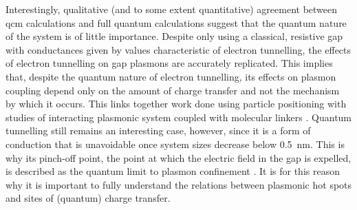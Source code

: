 \documentclass{article}
\begin{document}
Interestingly, qualitative (and to some extent quantitative) agreement between \gls{qcm} calculations and full quantum calculations suggest that the quantum nature of the system is of little importance. Despite only using a classical, resistive gap with conductances given by values characteristic of electron tunnelling, the effects of electron tunnelling on gap plasmons are accurately replicated. This implies that, despite the quantum nature of electron tunnelling, its effects on plasmon coupling depend only on the amount of charge transfer and not the mechanism by which it occurs. This links together work done using particle positioning \cite{savage2012, scholl2013} with studies of interacting plasmonic system coupled with molecular linkers \cite{tan2014, cha2014, benz2014}. Quantum tunnelling still remains an interesting case, however, since it is a form of conduction that is unavoidable once system sizes decrease below \SI{0.5}{nm}. This is why its pinch-off point, the point at which the electric field in the gap is expelled, is described as the quantum limit to plasmon confinement \cite{savage2012}. It is for this reason why it is important to fully understand the relations between plasmonic hot spots and sites of (quantum) charge transfer.
\end{document}
